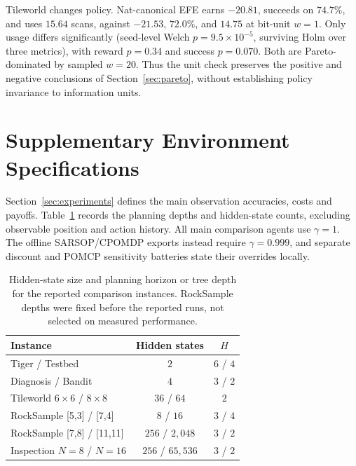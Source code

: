 \documentclass[runningheads]{llncs}
\newcommand{\tablefontsize}{\fontsize{9}{11}\selectfont\setlength{\tabcolsep}{3pt}}
\newenvironment{tablebody}{\tablefontsize}{}
\begin{document}
Tileworld changes policy. Nat-canonical EFE earns $-20.81$, succeeds on $74.7\%$, and uses $15.64$ scans, against $-21.53$, $72.0\%$, and $14.75$ at bit-unit $w=1$. Only usage differs significantly (seed-level Welch $p=9.5\times10^{-5}$, surviving Holm over three metrics), with reward $p=0.34$ and success $p=0.070$. Both are Pareto-dominated by sampled $w=20$. Thus the unit check preserves the positive and negative conclusions of Section~\ref{sec:pareto}, without establishing policy invariance to information units.

\FloatBarrier

\section{Supplementary Environment Specifications}
\label{app:envs}

Section~\ref{sec:experiments} defines the main observation accuracies, costs and payoffs. Table~\ref{tab:environment_depths} records the planning depths and hidden-state counts, excluding observable position and action history. All main comparison agents use $\gamma=1$. The offline SARSOP/CPOMDP exports instead require $\gamma=0.999$, and separate discount and POMCP sensitivity batteries state their overrides locally.

\begin{table}[htbp]
\centering
\caption{Hidden-state size and planning horizon or tree depth for the reported comparison instances. RockSample depths were fixed before the reported runs, not selected on measured performance.}
\label{tab:environment_depths}
\begin{tablebody}
\begin{tabular}{lcc}
\toprule
Instance & Hidden states & $H$ \\
\midrule
Tiger / Testbed & $2$ & $6$ / $4$ \\
Diagnosis / Bandit & $4$ & $3$ / $2$ \\
Tileworld $6\times6$ / $8\times8$ & $36$ / $64$ & $2$ \\
RockSample [5,3] / [7,4] & $8$ / $16$ & $3$ / $4$ \\
RockSample [7,8] / [11,11] & $256$ / $2{,}048$ & $3$ / $2$ \\
Inspection $N=8$ / $N=16$ & $256$ / $65{,}536$ & $3$ / $2$ \\
\bottomrule
\end{tabular}
\end{tablebody}
\end{table}
\end{document}

